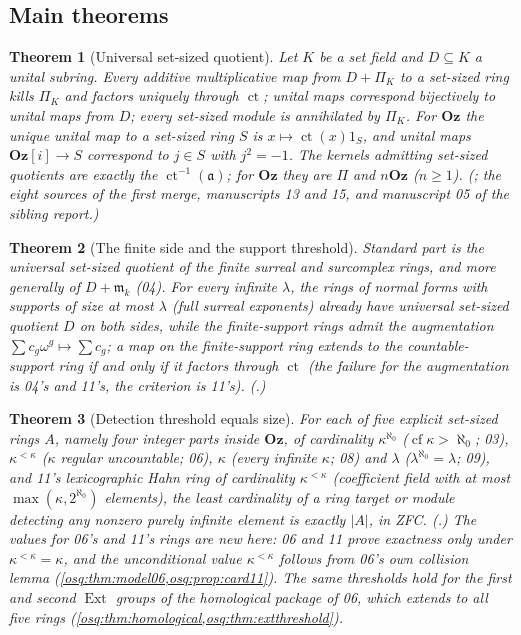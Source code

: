 \documentclass[11pt,letterpaper]{article}
\numberwithin{equation}{section}
\theoremstyle{definition}
\theoremstyle{remark}
\theoremstyle{plain}
\newtheorem{maintheorem}{Theorem}
\newcommand{\Oz}{\mathbf{Oz}}
\newcommand{\GOz}{\Oz[i]}
\newcommand{\mm}{\mathfrak m}        %
\newcommand{\ct}{\operatorname{ct}}
\newcommand{\Ext}{\operatorname{Ext}}
\newcommand{\cf}{\operatorname{cf}}
\begin{document}
\subsection{Main theorems}\label{osq:sub:main}

\begin{maintheorem}[Universal set-sized quotient]\label{osq:main:universal}
Let $K$ be a set field and $D\subseteq K$ a unital subring. Every additive multiplicative map
from $D+\Pi_K$ to a set-sized ring kills $\Pi_K$ and factors uniquely through $\ct$; unital
maps correspond bijectively to unital maps from $D$; every set-sized module is annihilated
by $\Pi_K$. For $\Oz$ the unique unital map to a set-sized ring $S$ is $x\mapsto\ct(x)1_S$, and
unital maps $\GOz\to S$ correspond to $j\in S$ with $j^2=-1$. The kernels admitting set-sized
quotients are exactly the $\ct^{-1}(\mathfrak a)$; for $\Oz$ they are $\Pi$ and $n\Oz$
($n\ge1$). (; the eight
sources of the first merge, manuscripts 13 and 15, and manuscript 05 of the sibling report.)
\end{maintheorem}

\begin{maintheorem}[The finite side and the support threshold]\label{osq:main:support}
Standard part is the universal set-sized quotient of the finite surreal and surcomplex rings,
and more generally of $D+\mm_k$ (04). For every infinite $\lambda$, the rings of normal forms
with supports of size at most $\lambda$ (full surreal exponents) already have universal
set-sized quotient $D$ on both sides, while the finite-support rings admit the augmentation
$\sum c_g\omega^g\mapsto\sum c_g$; a map on the finite-support ring extends to the countable-support
ring if and only if it factors through $\ct$ (the failure for the augmentation is 04's and 11's,
the criterion is 11's). (.)
\end{maintheorem}

\begin{maintheorem}[Detection threshold equals size]\label{osq:main:thresholds}
For each of five explicit set-sized rings $A$, namely four integer parts inside $\Oz$, of cardinality
$\kappa^{\aleph_0}$ ($\cf\kappa>\aleph_0$; 03), $\kappa^{<\kappa}$ ($\kappa$ regular
uncountable; 06), $\kappa$ (every infinite $\kappa$; 08) and $\lambda$ ($\lambda^{\aleph_0}=\lambda$;
09), and 11's lexicographic Hahn ring of cardinality $\kappa^{<\kappa}$ (coefficient field with at
most $\max(\kappa,2^{\aleph_0})$ elements), the least cardinality of a ring target
or module detecting any nonzero purely infinite element is exactly $|A|$, in ZFC.
(.) The values for 06's and 11's rings are new here: 06 and 11 prove
exactness only under $\kappa^{<\kappa}=\kappa$, and the unconditional value $\kappa^{<\kappa}$ follows
from 06's own collision lemma (\cref{osq:thm:model06,osq:prop:card11}). The same thresholds hold
for the first and second $\Ext$ groups of the homological package of 06, which extends to all five
rings (\cref{osq:thm:homological,osq:thm:extthreshold}).
\end{maintheorem}
\end{document}
